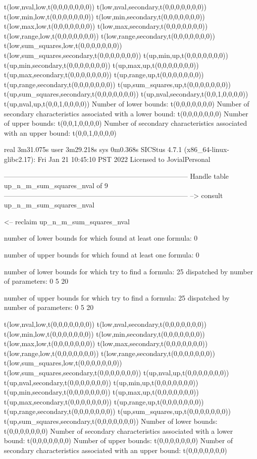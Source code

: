 t(low,nval,low,t(0,0,0,0,0,0,0))
t(low,nval,secondary,t(0,0,0,0,0,0,0))
t(low,min,low,t(0,0,0,0,0,0,0))
t(low,min,secondary,t(0,0,0,0,0,0,0))
t(low,max,low,t(0,0,0,0,0,0,0))
t(low,max,secondary,t(0,0,0,0,0,0,0))
t(low,range,low,t(0,0,0,0,0,0,0))
t(low,range,secondary,t(0,0,0,0,0,0,0))
t(low,sum_squares,low,t(0,0,0,0,0,0,0))
t(low,sum_squares,secondary,t(0,0,0,0,0,0,0))
t(up,min,up,t(0,0,0,0,0,0,0))
t(up,min,secondary,t(0,0,0,0,0,0,0))
t(up,max,up,t(0,0,0,0,0,0,0))
t(up,max,secondary,t(0,0,0,0,0,0,0))
t(up,range,up,t(0,0,0,0,0,0,0))
t(up,range,secondary,t(0,0,0,0,0,0,0))
t(up,sum_squares,up,t(0,0,0,0,0,0,0))
t(up,sum_squares,secondary,t(0,0,0,0,0,0,0))
t(up,nval,secondary,t(0,0,1,0,0,0,0))
t(up,nval,up,t(0,0,1,0,0,0,0))
Number of lower bounds:                                             t(0,0,0,0,0,0,0)
Number of secondary characteristics associated with a lower bound:  t(0,0,0,0,0,0,0)
Number of upper bounds:                                             t(0,0,1,0,0,0,0)
Number of secondary characteristics associated with an upper bound: t(0,0,1,0,0,0,0)

real	3m31.075s
user	3m29.218s
sys	0m0.368s
SICStus 4.7.1 (x86_64-linux-glibc2.17): Fri Jan 21 10:45:10 PST 2022
Licensed to JovialPersonal


--------------------------------------------------------------------------------
Handle table up_n_m_sum_squares_nval of 9
--------------------------------------------------------------------------------
--> consult up_n_m_sum_squares_nval

<-- reclaim up_n_m_sum_squares_nval

number of lower bounds for which found at least one formula: 0

number of upper bounds for which found at least one formula: 0

number of lower bounds for which try to find a formula: 25
dispatched by number of parameters: 0  5  20

number of upper bounds for which try to find a formula: 25
dispatched by number of parameters: 0  5  20

t(low,nval,low,t(0,0,0,0,0,0,0))
t(low,nval,secondary,t(0,0,0,0,0,0,0))
t(low,min,low,t(0,0,0,0,0,0,0))
t(low,min,secondary,t(0,0,0,0,0,0,0))
t(low,max,low,t(0,0,0,0,0,0,0))
t(low,max,secondary,t(0,0,0,0,0,0,0))
t(low,range,low,t(0,0,0,0,0,0,0))
t(low,range,secondary,t(0,0,0,0,0,0,0))
t(low,sum_squares,low,t(0,0,0,0,0,0,0))
t(low,sum_squares,secondary,t(0,0,0,0,0,0,0))
t(up,nval,up,t(0,0,0,0,0,0,0))
t(up,nval,secondary,t(0,0,0,0,0,0,0))
t(up,min,up,t(0,0,0,0,0,0,0))
t(up,min,secondary,t(0,0,0,0,0,0,0))
t(up,max,up,t(0,0,0,0,0,0,0))
t(up,max,secondary,t(0,0,0,0,0,0,0))
t(up,range,up,t(0,0,0,0,0,0,0))
t(up,range,secondary,t(0,0,0,0,0,0,0))
t(up,sum_squares,up,t(0,0,0,0,0,0,0))
t(up,sum_squares,secondary,t(0,0,0,0,0,0,0))
Number of lower bounds:                                             t(0,0,0,0,0,0,0)
Number of secondary characteristics associated with a lower bound:  t(0,0,0,0,0,0,0)
Number of upper bounds:                                             t(0,0,0,0,0,0,0)
Number of secondary characteristics associated with an upper bound: t(0,0,0,0,0,0,0)


